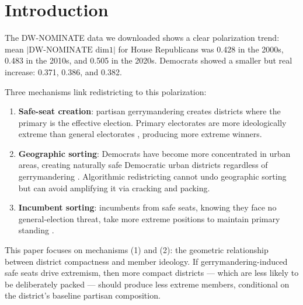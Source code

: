 \section{Introduction}

The DW-NOMINATE data we downloaded shows a clear polarization trend:
mean $|\text{DW-NOMINATE dim1}|$ for House Republicans was 0.428 in the 2000s,
0.483 in the 2010s, and 0.505 in the 2020s.
Democrats showed a smaller but real increase: 0.371, 0.386, and 0.382.

Three mechanisms link redistricting to this polarization:

\begin{enumerate}
  \item \textbf{Safe-seat creation}: partisan gerrymandering creates districts
    where the primary is the effective election.
    Primary electorates are more ideologically extreme than general electorates
    \citep{brady2007move}, producing more extreme winners.
  \item \textbf{Geographic sorting}: Democrats have become more concentrated
    in urban areas, creating naturally safe Democratic urban districts
    regardless of gerrymandering \citep{rodden2019cities}.
    Algorithmic redistricting cannot undo geographic sorting but can avoid
    amplifying it via cracking and packing.
  \item \textbf{Incumbent sorting}: incumbents from safe seats, knowing they
    face no general-election threat, take more extreme positions to maintain
    primary standing \citep{canes-wrone2002out}.
\end{enumerate}

This paper focuses on mechanisms (1) and (2): the geometric relationship between
district compactness and member ideology.
If gerrymandering-induced safe seats drive extremism, then more compact districts
--- which are less likely to be deliberately packed --- should produce less extreme
members, conditional on the district's baseline partisan composition.
